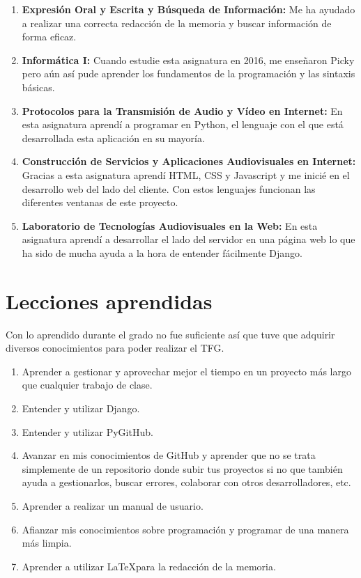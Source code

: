 \documentclass[a4paper, 12pt]{book}
\begin{document}
\begin{enumerate}
  \item \textbf{Expresión Oral y Escrita y Búsqueda de Información:} Me ha ayudado a realizar una correcta redacción de la memoria y buscar información de forma eficaz.
  \item \textbf{Informática I:} Cuando estudie esta asignatura en 2016, me enseñaron Picky pero aún así pude aprender los fundamentos de la programación y las sintaxis básicas.
  \item \textbf{Protocolos para la Transmisión de Audio y Vídeo en Internet:} En esta asignatura aprendí a programar en Python, el lenguaje con el que está desarrollada esta aplicación en su mayoría.
  \item \textbf{Construcción de Servicios y Aplicaciones Audiovisuales en Internet:} Gracias a esta asignatura aprendí HTML, CSS y Javascript y me inicié en el desarrollo web del lado del cliente. Con estos lenguajes funcionan las diferentes ventanas de este proyecto.
  \item \textbf{Laboratorio de Tecnologías Audiovisuales en la Web:} En esta asignatura aprendí a desarrollar el lado del servidor en una página web lo que ha sido de mucha ayuda a la hora de entender fácilmente Django.
\end{enumerate}


\section{Lecciones aprendidas}
\label{sec:lecciones_aprendidas}

Con lo aprendido durante el grado no fue suficiente así que tuve que adquirir diversos conocimientos para poder realizar el TFG.

\begin{enumerate}
  \item Aprender a gestionar y aprovechar mejor el tiempo en un proyecto más largo que cualquier trabajo de clase.
  \item Entender y utilizar Django.
  \item Entender y utilizar PyGitHub.
  \item Avanzar en mis conocimientos de GitHub y aprender que no se trata simplemente de un repositorio donde subir tus proyectos si no que también ayuda a gestionarlos, buscar errores, colaborar con otros desarrolladores, etc.
  \item Aprender a realizar un manual de usuario.
  \item Afianzar mis conocimientos sobre programación y programar de una manera más limpia.
  \item Aprender a utilizar \LaTeX  para la redacción de la memoria.
\end{enumerate}
\end{document}
